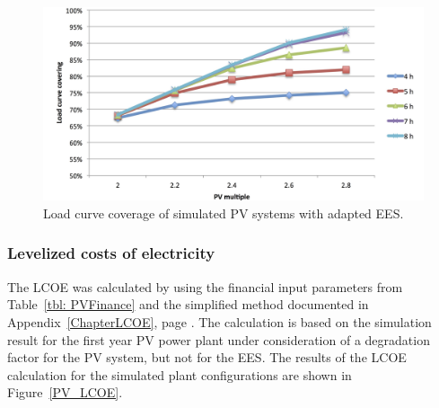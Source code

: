 \begin{figure}[htbp]  
\centering
\includegraphics[width=0.93\linewidth]{FIG/PV_LCCF}
\caption[Load curve coverage of simulated PV systems with adapted EES.]{Load curve coverage of simulated PV systems with adapted EES.}\label{PV_LCCF}
\end{figure}
\pagebreak
\subsubsection{Levelized costs of electricity}

The \ac{LCOE} was calculated by using the financial input parameters from Table~\ref{tbl: PVFinance} and the simplified method documented in Appendix~\ref{ChapterLCOE}, page \pageref{ChapterLCOE}. The calculation is based on the simulation result for the first year \ac{PV} power plant under consideration of a degradation factor for the \ac{PV} system, but not for the \ac{EES}. The results of the \ac{LCOE} calculation for the simulated plant configurations are shown in Figure~\ref{PV_LCOE}. 


